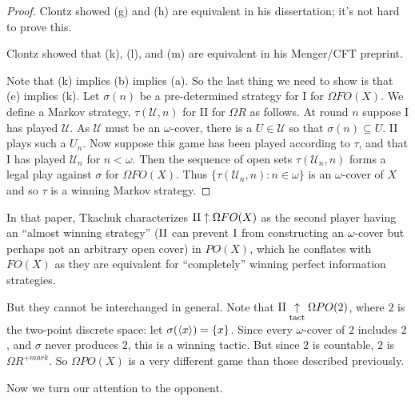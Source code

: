 \documentclass[11pt]{article}
\theoremstyle{plain}
\theoremstyle{definition}
\theoremstyle{remark}
\theoremstyle{plain}
\theoremstyle{definition}
\theoremstyle{remark}
\begin{document}
\begin{proof}
Clontz showed (g) and (h) are equivalent in his dissertation; it's
not hard to prove this.

Clontz showed that (k), (l), and (m) are equivalent in his
Menger/CFT preprint.

Note that (k) implies (b) implies (a).
So the last thing we need to show is that (e) implies (k).
Let \(\sigma(n)\) be a pre-determined strategy for I for \(\Omega FO(X)\).
We define a Markov strategy, \(\tau(\mathcal{U},n)\) for II for \(\Omega R\) as follows.
At round \(n\) suppose I has played \(\mathcal{U}\).
As \(\mathcal{U}\) must be an \(\omega\)-cover, there is a \(U \in \mathcal{U}\) so that \(\sigma(n) \subseteq U\).
II plays such a \(U_n\).
Now suppose this game has been played according to \(\tau\), and that I has played \(\mathcal{U}_n\) for \(n < \omega\).
Then the sequence of open sets \(\tau(\mathcal{U}_n,n)\) forms a legal play against \(\sigma\) for \(\Omega FO(X)\).
Thus \(\{\tau(\mathcal{U}_n,n) : n \in \omega\}\) is an \(\omega\)-cover of \(X\) and so \(\tau\) is a winning Markov strategy.
\end{proof}

In that paper, Tkachuk characterizes \(\mathrm{II}\uparrow\Omega FO(X)\)
as the second player having an ``almost winning strategy''
(\(\mathrm{II}\) can prevent \(\mathrm{I}\) from constructing an \(\omega\)-cover
but perhaps not an arbitrary open cover)
in \(PO(X)\), which he conflates with \(FO(X)\) as they are
equivalent for ``completely'' winning perfect information strategies. 

But they cannot be interchanged in general.
Note that \(\mathrm{II}\underset{\text{tact}}{\uparrow}\Omega PO(2)\), where \(2\) is the two-point discrete space:
let \(\sigma(\langle x\rangle)=\{x\}\). Since every \(\omega\)-cover of \(2\) includes \(2\),
and \(\sigma\) never produces \(2\), this is a winning tactic. But since \(2\)
is countable, \(2\) is \(\Omega R^{+mark}\).
So \(\Omega PO(X)\) is a very different game than those described previously.


Now we turn our attention to the opponent.
\end{document}
